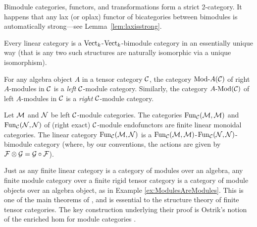 \documentclass{amsart}
\begin{document}
%
\nid Bimodule categories, functors, and transformations form a strict 2-category.  %
It happens that any lax (or oplax) functor of bicategories between bimodules is automatically strong---see Lemma~\ref{lem:laxisstrong}.

\begin{example}
	Every linear category is a $\mathrm{Vect}_k$-$\mathrm{Vect}_k$-bimodule category in an essentially unique way (that is any two such structures are naturally isomorphic via a unique isomorphism). %
\end{example}

\begin{example} \label{ex:ModulesAreModules}
	For any algebra object $A$ in a tensor category $\mathcal C$, the category $\Mod{}{A}(\cC)$ of right $A$-modules in $\mathcal C$ is a \emph{left} $\mathcal C$-module category.  Similarly, the category $\Mod{A}{}(\cC)$ of left $A$-modules in $\mathcal C$ is a \emph{right} $\mathcal C$-module category.
\end{example}

\begin{example}
	Let $\mathcal M$ and $\mathcal N$ be left $\mathcal C$-module categories. The categories $\operatorname{Fun}_{\mathcal C}(\mathcal M, \mathcal M)$ and $\operatorname{Fun}_{\mathcal C}(\mathcal N, \mathcal N)$ of (right exact) $\mathcal C$-module endofunctors are finite linear monoidal categories. The linear category $\operatorname{Fun}_{\mathcal C}(\mathcal M, \mathcal N)$ is a $\operatorname{Fun}_{\mathcal C}(\mathcal M, \mathcal M)$-$\operatorname{Fun}_{\mathcal C}(\mathcal N, \mathcal N)$-bimodule category (where, by our conventions, the actions are given by $\mathcal F \otimes \mathcal G = \mathcal G \circ \mathcal F$). 
\end{example}

Just as any finite linear category is a category of modules over an algebra, any finite module category over a finite rigid tensor category is a category of module objects over an algebra object, as in Example \ref{ex:ModulesAreModules}.  This is one of the main theorems of \cite{EGNO}, and is essential to the structure theory of finite tensor categories.  The key construction underlying their proof is Ostrik's notion of the enriched hom for module categories \cite{MR1976459}.  
\end{document}
